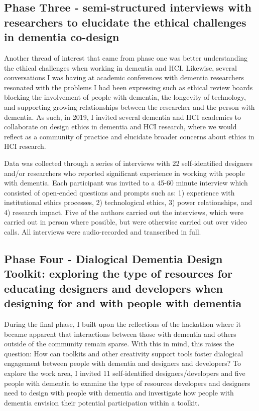 \subsection{Phase Three - semi-structured interviews with researchers to elucidate the ethical challenges in dementia co-design}

Another thread of interest that came from phase one was better understanding the ethical challenges when working in dementia and HCI. Likewise, several conversations I was having at academic conferences with dementia researchers resonated with the problems I had been expressing such as ethical review boards blocking the involvement of people with dementia, the longevity of technology, and supporting growing relationships between the researcher and the person with dementia. As such, in 2019, I invited several dementia and HCI academics to collaborate on design ethics in dementia and HCI research, where we would reflect as a community of practice and elucidate broader concerns about ethics in HCI research.

Data was collected through a series of interviews with 22 self-identified designers and/or researchers who reported significant experience in working with people with dementia. Each participant was invited to a 45-60 minute interview which consisted of open-ended questions and prompts such as: 1) experience with institutional ethics processes, 2) technological ethics, 3) power relationships, and 4) research impact. Five of the authors carried out the interviews, which were carried out in person where possible, but were otherwise carried out over video calls. All interviews were audio-recorded and transcribed in full. 

\subsection{Phase Four - Dialogical Dementia Design Toolkit: exploring the type of resources for educating designers and developers when designing for and with people with dementia}

During the final phase, I built upon the reflections of the hackathon where it became apparent that interactions between those with dementia and others outside of the community remain sparse. With this in mind, this raises the question: How can toolkits and other creativity support tools foster dialogical engagement between people with dementia and designers and developers? To explore the work area, I invited 11 self-identified designers/developers and five people with dementia to examine the type of resources developers and designers need to design with people with dementia and investigate how people with dementia envision their potential participation within a toolkit. 

